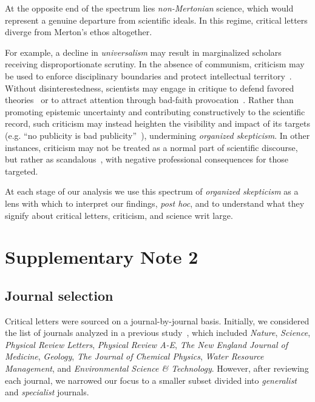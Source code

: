\documentclass[12pt]{article} %
\begin{document}
At the opposite end of the spectrum lies \textit{non-Mertonian} science, which would represent a genuine departure from scientific ideals.
In this regime, critical letters diverge from Merton's ethos altogether.

For example, a decline in \textit{universalism} may result in marginalized scholars receiving disproportionate scrutiny. 
In the absence of communism, criticism may be used to enforce disciplinary boundaries and protect intellectual territory~\cite{Gieryn1999, Klein2021}.
Without disinterestedness, scientists may engage in critique to defend favored theories~\cite{azoulay_2019_funeral} or to attract attention through bad-faith provocation~\cite{tannen2002agonism}.
Rather than promoting epistemic uncertainty and contributing constructively to the scientific record, such criticism may instead heighten the visibility and impact of its targets (e.g. ``no publicity is bad publicity''~\cite{radicchi_2012_comment}), undermining \textit{organized skepticism}.
In other instances, criticism may not be treated as a normal part of scientific discourse, but rather as scandalous~\cite{azoulay_2017_scandal}, with negative professional consequences for those targeted.

At each stage of our analysis we use this spectrum of \textit{organized skepticism} as a lens with which to interpret our findings, \textit{post hoc}, and to understand what they signify about critical letters, criticism, and science writ large. 

\section*{Supplementary Note 2}
\label{si:text:journal-selection}
\subsection*{Journal selection}
Critical letters were sourced on a journal-by-journal basis. 
Initially, we considered the list of journals analyzed in a previous study~\cite{radicchi_2012_comment}, which included \textit{Nature}, \textit{Science}, \textit{Physical Review Letters}, \textit{Physical Review A-E}, \textit{The New England Journal of Medicine}, \textit{Geology}, \textit{The Journal of Chemical Physics}, \textit{Water Resource Management}, and \textit{Environmental Science \& Technology}. 
However, after reviewing each journal, we narrowed our focus to a smaller subset divided into \textit{generalist} and \textit{specialist} journals.
\end{document}

